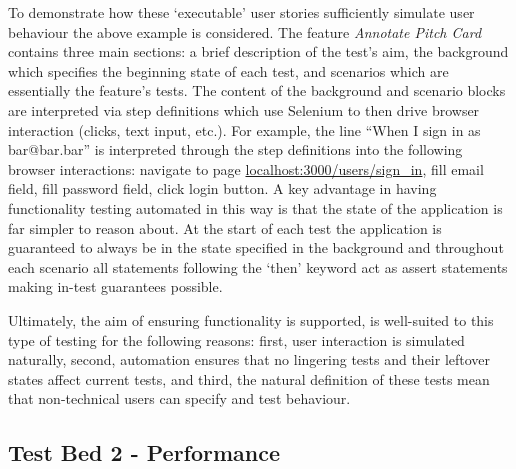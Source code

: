 To demonstrate how these `executable' user stories sufficiently simulate user behaviour the above example is considered. The feature \textit{Annotate Pitch Card} contains three main sections: a brief description of the test's aim, the background which specifies the beginning state of each test, and scenarios which are essentially the feature's tests. The content of the background and scenario blocks are interpreted via step definitions which use Selenium to then drive browser interaction (clicks, text input, etc.). For example, the line ``When I sign in as bar@bar.bar'' is interpreted through the step definitions into the following browser interactions: navigate to page \url{localhost:3000/users/sign_in}, fill email field, fill password field, click login button.
A key advantage in having functionality testing automated in this way is that the state of the application is far simpler to reason about. At the start of each test the application is guaranteed to always be in the state specified in the background and throughout each scenario all statements following the `then' keyword act as assert statements making in-test guarantees possible.

Ultimately, the aim of ensuring functionality is supported, is well-suited to this type of testing for the following reasons: first, user interaction is simulated naturally, second, automation ensures that no lingering tests and their leftover states affect current tests, and third, the natural definition of these tests mean that non-technical users can specify and test behaviour.

\subsection{Test Bed 2 - Performance}\label{SS:performance}

